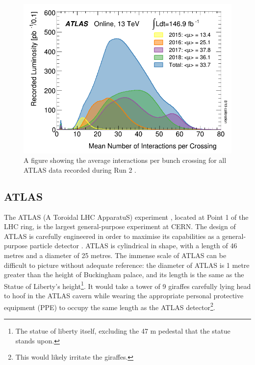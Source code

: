 \documentclass[12pt,a4paper,epsf,portrait,times,epsfig]{article}
\begin{document}
		\begin{figure}
			\centering
			\includegraphics[scale=0.4]{ATLAS_Pileup_Run2.png}
			\caption{A figure showing the average interactions per bunch crossing for all ATLAS data recorded during Run 2 \cite{ATLASLumiPublic}.}
			\label{Fig:ATLASPileup}
		\end{figure}

		\subsection{ATLAS}

		The ATLAS (A Toroidal LHC ApparatuS) experiment \cite{ATLAS_Collab}, located at Point 1 of the LHC ring, is the largest general-purpose experiment at CERN. The design of ATLAS is carefully engineered in order to maximise its capabilities as a general-purpose particle detector \cite{ATLAS-TDR-01, ATLAS-TDR-02, Article:ATLASDesignPaper}. ATLAS is cylindrical in shape, with a length of 46 metres and a diameter of 25 metres. The immense scale of ATLAS can be difficult to picture without adequate reference: the diameter of ATLAS is 1 metre greater than the height of Buckingham palace, and its length is the same as the Statue of Liberty's height\footnote{The statue of liberty itself, excluding the 47 m pedestal that the statue stands upon.}. It would take a tower of 9 giraffes carefully lying head to hoof in the ATLAS cavern while wearing the appropriate personal protective equipment (PPE) to occupy the same length as the ATLAS detector\footnote{This would likely irritate the giraffes.}. 

\end{document}
